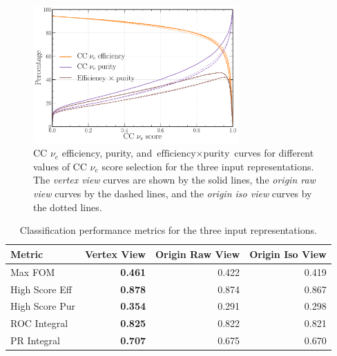 \begin{figure} %
    \includegraphics[width=0.7\textwidth]{diagrams/7-results/repr_nuel_eff_curves.pdf}
    \caption[CC $\nu_{e}$ efficiency and purity curves for different input representations]
    {CC $\nu_{e}$ efficiency, purity, and $\text{efficiency}\times\text{purity}$ curves for
        different values of CC $\nu_{e}$ score selection for the three input representations. The
        \emph{vertex view} curves are shown by the solid lines, the \emph{origin raw view} curves
        by the dashed lines, and the \emph{origin iso view} curves by the dotted lines.}
    \label{fig:repr_nuel_eff_curves}
\end{figure}

\begin{table} %
    \begin{tabular}{lrrr}
        Metric         & Vertex View    & Origin Raw View & Origin Iso View \\
        \midrule
        Max FOM        & \textbf{0.461} & 0.422           & 0.419           \\
        High Score Eff & \textbf{0.878} & 0.874           & 0.867           \\
        High Score Pur & \textbf{0.354} & 0.291           & 0.298           \\
        ROC Integral   & \textbf{0.825} & 0.822           & 0.821           \\
        PR Integral    & \textbf{0.707} & 0.675           & 0.670           \\
    \end{tabular}
    \caption[Classification performance metrics for different input representations]
    {Classification performance metrics for the three input representations.}
    \label{tab:repr}
\end{table}


